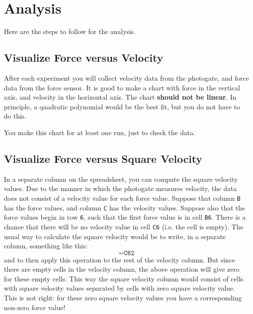 \section{Analysis}
Here are the steps to follow for the analysis.
\subsection{Visualize Force versus Velocity}
After each experiment you will collect velocity data from the photogate, and force data from the force sensor. It is good to make a chart with force in the vertical axis, and velocity in the horizontal axis. The chart \textbf{should not be linear}. In principle, a quadratic polynomial would be the best fit, but you do not have to do this.

You make this chart for at least one run, just to check the data.
\subsection{Visualize Force versus Square Velocity}
In a separate column on the spreadsheet, you can compute the square velocity values. Due to the manner in which the photogate measures velocity, the data does not consist of a velocity value for each force value. Suppose that column \texttt{B} has the force values, and column \texttt{C} has the velocity values. Suppose also that the force values begin in row \texttt{6}, such that the first force value is in cell \texttt{B6}. There is a chance that there will be no velocity value in cell \texttt{C6} (i.e. the cell is empty). The usual way to calculate the square velocity would be to write, in a separate column, something like this:
\begin{equation}
    \texttt{=C6\^{}2}
\end{equation}
and to then apply this operation to the rest of the velocity column. But since there are empty cells in the velocity column, the above operation will give zero for these empty cells. This way the square velocity column would consist of cells with square velocity values separated by cells with zero square velocity value. This is not right: for these zero square velocity values you have a corresponding non-zero force value!

